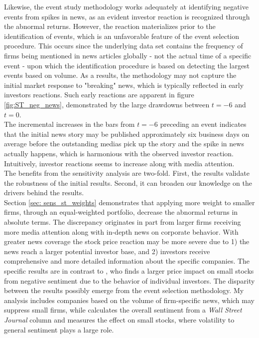 Likewise, the event study methodology works adequately at identifying negative events from spikes in news, as an evident investor reaction is recognized through the abnormal returns. However, the reaction materializes prior to the identification of events, which is an unfavorable feature of the event selection procedure. This occurs since the underlying data set contains the frequency of firms being mentioned in news articles globally - not the actual time of a specific event - upon which the identification procedure is based on detecting the largest events based on volume. As a results, the methodology may not capture the initial market response to "breaking" news, which is typically reflected in early investors reactions. Such early reactions are apparent in figure \ref{fig:ST_neg_news}, demonstrated by the large drawdowns between $t = -6$ and $t = 0$. \\
The incremental increases in the bars from $t=-6$ preceding an event indicates that the initial news story may be published approximately six business days on average before the outstanding medias pick up the story and the spike in news actually happens, which is harmonious with the observed investor reaction. Intuitively, investor reactions seems to increase along with media attention. \\

The benefits from the sensitivity analysis are two-fold. First, the results validate the robustness of the initial results. Second, it can broaden our knowledge on the drivers behind the results. \\

Section \ref{sec: sens_st_weights} demonstrates that applying more weight to smaller firms, through an equal-weighted portfolio, decrease the abnormal returns in absolute terms. The discrepancy originates in part from larger firms receiving more media attention along with in-depth news on corporate behavior. With greater news coverage the stock price reaction may be more severe due to 1) the news reach a larger potential investor base, and 2) investors receive comprehensive and more detailed information about the specific companies. The specific results are in contrast to \cite{tetlock_sentiment}, who finds a larger price impact on small stocks from negative sentiment due to the behavior of individual investors. The disparity between the results possibly emerge from the event selection methodology. My analysis includes companies based on the volume of firm-specific news, which may suppress small firms, while \citeauthor{tetlock_sentiment} calculates the overall sentiment from a \textit{Wall Street Journal} column and measures the effect on small stocks, where volatility to general sentiment plays a large role.  

